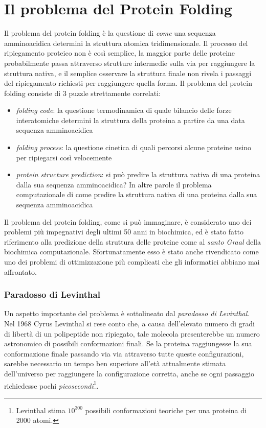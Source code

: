 \section{Il problema del Protein Folding} \label{sec:problema-protein-folding}
{
Il problema del protein folding è la questione di \textit{come} una sequenza amminoacidica determini la struttura atomica tridimensionale. Il processo del ripiegamento proteico non è così semplice, la maggior parte delle proteine probabilmente passa attraverso strutture intermedie sulla via per raggiungere la struttura nativa, e il semplice osservare la struttura finale non rivela i passaggi del ripiegamento richiesti per raggiungere quella forma. Il problema del protein folding consiste di 3 puzzle strettamente correlati\supercite{dill2008protein}:
\begin{itemize}
	\item \textit{folding code}: la questione termodinamica di quale bilancio delle forze interatomiche determini la struttura della proteina a partire da una data sequenza amminoacidica
	
	\item \textit{folding process}: la questione cinetica di quali percorsi alcune proteine usino per ripiegarsi così velocemente
	
	\item\textit{protein structure prediction}: si può predire la struttura nativa di una proteina dalla sua sequenza amminoacidica? In altre parole il problema computazionale di come predire la struttura nativa di una proteina dalla sua sequenza amminoacidica
	
\end{itemize}	

Il problema del protein folding, come si può immaginare, è considerato uno dei problemi più impegnativi degli ultimi 50 anni in biochimica, ed è stato fatto riferimento alla predizione della struttura delle proteine come al \textit{santo Graal} della biochimica computazionale\supercite{abbass2020enhancing}. Sfortunatamente esso è stato anche rivendicato come uno dei problemi di ottimizzazione più complicati che gli informatici abbiano mai affrontato\supercite{abbass2020enhancing}.

\subsubsection{Paradosso di Levinthal}

 Un aspetto importante del problema è sottolineato dal \textit{paradosso di Levinthal}. Nel 1968 Cyrus Levinthal\supercite{levinthal1969fold} si rese conto che, a causa dell'elevato numero di gradi di libertà di un polipeptide non ripiegato, tale molecola presenterebbe un numero astronomico di possibili conformazioni finali. Se la proteina raggiungesse la sua conformazione finale passando via via attraverso tutte queste configurazioni, sarebbe necessario un tempo ben superiore all'età attualmente stimata dell'universo per raggiungere la configurazione corretta, anche se ogni passaggio richiedesse pochi \textit{picosecondi}\footnote{Levinthal\supercite{levinthal1969fold} stima $10^{300}$ possibili conformazioni teoriche per una proteina di 2000 atomi.}.
 
}
